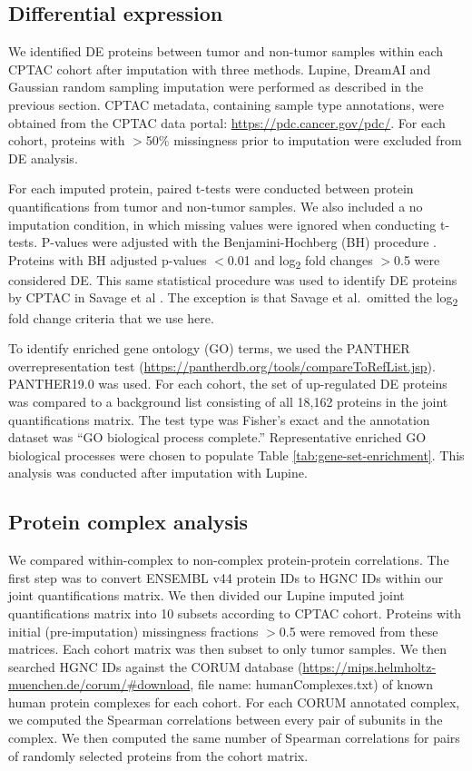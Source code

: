 \documentclass{article}
\begin{document}
\subsection{Differential expression}
\label{sec:differential-expression}

We identified DE proteins between tumor and non-tumor samples within each CPTAC cohort after imputation with three methods. Lupine, DreamAI and Gaussian random sampling imputation were performed as described in the previous section. CPTAC metadata, containing sample type annotations, were obtained from the CPTAC data portal: \url{https://pdc.cancer.gov/pdc/}. For each cohort, proteins with $>$50\% missingness prior to imputation were excluded from DE analysis. 

For each imputed protein, paired t-tests were conducted between protein quantifications from tumor and non-tumor samples. We also included a no imputation condition, in which missing values were ignored when conducting t-tests. P-values were adjusted with the Benjamini-Hochberg (BH) procedure \cite{bj-adjust}. Proteins with BH adjusted p-values $<$0.01 and log\textsubscript{2} fold changes $>$0.5 were considered DE. This same statistical procedure was used to identify DE proteins by CPTAC in Savage et al \cite{savage-2024}. The exception is that Savage et al.\ omitted the log\textsubscript{2} fold change criteria that we use here. 

To identify enriched gene ontology (GO) terms, we used the PANTHER overrepresentation test (\url{https://pantherdb.org/tools/compareToRefList.jsp}). PANTHER19.0 was used. For each cohort, the set of up-regulated DE proteins was compared to a background list consisting of all 18,162 proteins in the joint quantifications matrix. The test type was Fisher’s exact and the annotation dataset was ``GO biological process complete.'' Representative enriched GO biological processes were chosen to populate Table \ref{tab:gene-set-enrichment}. This analysis was conducted after imputation with Lupine. 

\subsection{Protein complex analysis}

We compared within-complex to non-complex protein-protein correlations. The first step was to convert ENSEMBL v44 protein IDs to HGNC IDs within our joint quantifications matrix. We then divided our Lupine imputed joint quantifications matrix into 10 subsets according to CPTAC cohort. Proteins with initial (pre-imputation) missingness fractions $>$0.5 were removed from these matrices. Each cohort matrix was then subset to only tumor samples. We then searched HGNC IDs against the CORUM database (\url{https://mips.helmholtz-muenchen.de/corum/#download}, file name: humanComplexes.txt) of known human protein complexes \cite{corum} for each cohort. For each CORUM annotated complex, we computed the Spearman correlations between every pair of subunits in the complex. We then computed the same number of Spearman correlations for pairs of randomly selected proteins from the cohort matrix.
\end{document}
